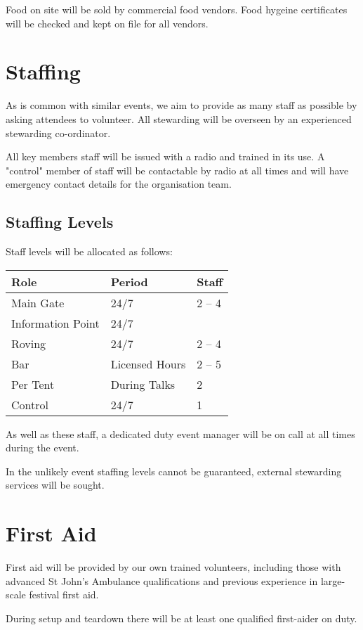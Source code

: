 Food on site will be sold by commercial food vendors. Food hygeine certificates will be checked and kept on
file for all vendors.

\section{Staffing}

As is common with similar events, we aim to provide as many staff as possible
by asking attendees to volunteer. All stewarding will be overseen by an experienced stewarding co-ordinator.

All key members staff will be issued with a radio and trained in its use. A "control" member of staff will be
contactable by radio at all times and will have emergency contact details for the organisation team.

\subsection{Staffing Levels}

Staff levels will be allocated as follows:

\begin{tabular}{l l l}
Role & Period & Staff \\
\hline
Main Gate & 24/7 & 2 -- 4 \\
Information Point & 24/7 & \\
Roving & 24/7 & 2 -- 4 \\
Bar & Licensed Hours & 2 -- 5 \\
Per Tent & During Talks & 2 \\
Control & 24/7 & 1
\end{tabular}

As well as these staff, a dedicated duty event manager will be on call at all times during the event.

In the unlikely event staffing levels cannot be guaranteed, external stewarding services will be sought.

\section{First Aid}

First aid will be provided by our own trained volunteers, including those with advanced St John's Ambulance
qualifications and previous experience in large-scale festival first aid.

During setup and teardown there will be at least one qualified first-aider on duty.

